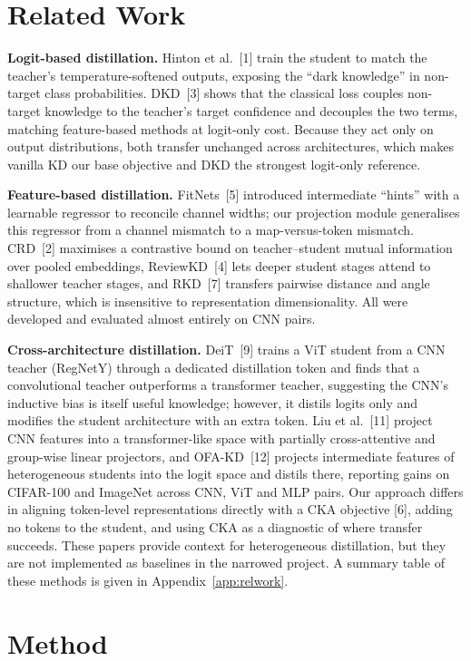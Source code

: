 \documentclass[11pt, letterpaper]{article}
\begin{document}
\section{Related Work}

\textbf{Logit-based distillation.} Hinton et al.~[1] train the student to match
the teacher's temperature-softened outputs, exposing the ``dark knowledge'' in
non-target class probabilities. DKD~[3] shows that the classical loss couples
non-target knowledge to the teacher's target confidence and decouples the two
terms, matching feature-based methods at logit-only cost. Because they act only
on output distributions, both transfer unchanged across architectures, which
makes vanilla KD our base objective and DKD the strongest logit-only reference.

\textbf{Feature-based distillation.} FitNets~[5] introduced intermediate
``hints'' with a learnable regressor to reconcile channel widths; our projection
module generalises this regressor from a channel mismatch to a map-versus-token
mismatch. CRD~[2] maximises a contrastive bound on teacher--student mutual
information over pooled embeddings, ReviewKD~[4] lets deeper student stages
attend to shallower teacher stages, and RKD~[7] transfers pairwise distance and
angle structure, which is insensitive to representation dimensionality. All
were developed and evaluated almost entirely on CNN pairs.

\textbf{Cross-architecture distillation.} DeiT~[9] trains a ViT student from a
CNN teacher (RegNetY) through a dedicated distillation token and finds that a
convolutional teacher outperforms a transformer teacher, suggesting the CNN's
inductive bias is itself useful knowledge; however, it distils logits only and
modifies the student architecture with an extra token. Liu et al.~[11] project
CNN features into a transformer-like space with partially cross-attentive and
group-wise linear projectors, and OFA-KD~[12] projects intermediate features of
heterogeneous students into the logit space and distils there, reporting gains
on CIFAR-100 and ImageNet across CNN, ViT and MLP pairs. Our approach differs in
aligning token-level representations directly with a CKA objective [6], adding
no tokens to the student, and using CKA as a diagnostic of where transfer
succeeds. These papers provide context for heterogeneous distillation, but
they are not implemented as baselines in the narrowed project.
A summary table of these methods is given in Appendix~\ref{app:relwork}.


\section{Method}
\end{document}
